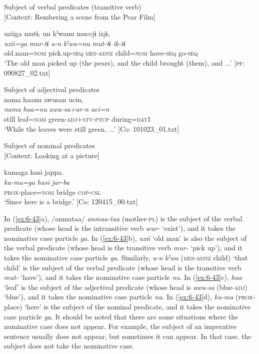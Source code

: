 \ex Subject of verbal predicates (transitive verb)\\{}
[Context: Rembering a scene from the Pear Film]

{\TM}
\glll uziiga  mutɨ,  un  kˀwanu  muccjɨ  izjɨ,\\
      \textit{uzii=ga}  \textit{mur-tɨ}  \textit{u-n}  \textit{kˀwa=nu}     \textit{mut-tɨ}  \textit{ik-tɨ}\\
      old.man=\textsc{nom}  pick.up-\textsc{seq}  \textsc{mes}-\textsc{adnz}  child=\textsc{nom} have-\textsc{seq}  go-\textsc{seq}\\
\glt ‘The old man picked up (the pears), and the child brought (them), and ...’ [\textsc{pf}: 090827\_02.txt]
\z

\ex Subject of adjectival predicates\\
{\TM}
\glll  nama  haanu  awusan  ucin,\\
\textit{nama}  \textit{haa=nu}  \textit{awu-sa+ar-n}  \textit{uci=n}\\
still  leaf=\textsc{nom}  green-\textsc{adj}+\textsc{stv}-\textsc{ptcp}  during=\textsc{dat}1\\
\glt ‘While the leaves were still green, ...’ [Co: 101023\_01.txt]
\z

\ex Subject of nominal predicates\\{}
[Context: Looking at a picture]

{\TM}
\glll kumaga  hasi  jappa.\\
      \textit{ku-ma=ga}  \textit{hasi}  \textit{jar-ba}\\
      \textsc{prox}-place=\textsc{nom}  bridge  \textsc{cop}-\textsc{csl}\\
\glt ‘Since here is a bridge.’ [Co: 120415\_00.txt]
\z

In (\ref{ex:6-43}a), /anmataa/ \textit{anmaa-taa} (mother-\textsc{pl}) is the subject of the verbal predicate (whose head is the intransitive verb \textit{wur-} ‘exist’), and it takes the nominative case particle \textit{ga}. In (\ref{ex:6-43}b), \textit{uzii} ‘old man’ is also the subject of the verbal predicate (whose head is the transitive verb \textit{mur-} ‘pick up’), and it takes the nominative case particle \textit{ga}. Similarly, \textit{u-n} \textit{kˀwa} (\textsc{mes}-\textsc{adnz} child) ‘that child’ is the subject of the verbal predicate (whose head is the transitive verb \textit{mut-} ‘have’), and it takes the nominative case particle \textit{nu}. In (\ref{ex:6-43}c), \textit{haa} ‘leaf’ is the subject of the adjectival predicate (whose head is \textit{awu-sa} (blue-\textsc{adj}) ‘blue’), and it takes the nominative case particle \textit{nu}. In (\ref{ex:6-43}d), \textit{ku-ma} (\textsc{prox}-place) ‘here’ is the subject of the nominal predicate, and it takes the nominative case particle \textit{ga}. It should be noted that there are some situations where the nominative case does not appear. For example, the subject of an imperative sentence usually does not appear, but sometimes it can appear. In that case, the subject does not take the nominative case.

